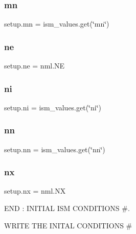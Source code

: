 \subsubsection{\texorpdfstring{mn}{mn}}
{\footnotesize\ttfamily setup.\+mn = ism\+\_\+values.\+get(\char`\"{}mn\char`\"{})}

\mbox{\label{namespacesetup_ac05943ff8cb3a75793d6458785d0a79f}} 
\subsubsection{\texorpdfstring{ne}{ne}}
{\footnotesize\ttfamily setup.\+ne = nml.\+NE}

\mbox{\label{namespacesetup_ad9ce8bcb8e2c0ccab520d9f110ea46a7}} 
\subsubsection{\texorpdfstring{ni}{ni}}
{\footnotesize\ttfamily setup.\+ni = ism\+\_\+values.\+get(\char`\"{}ni\char`\"{})}

\mbox{\label{namespacesetup_a26490aaba8991b0c3889206244da6ebf}} 
\subsubsection{\texorpdfstring{nn}{nn}}
{\footnotesize\ttfamily setup.\+nn = ism\+\_\+values.\+get(\char`\"{}nn\char`\"{})}

\mbox{\label{namespacesetup_acdd28dabaab21c1904ea9382e5f6a8db}} 
\subsubsection{\texorpdfstring{nx}{nx}}
{\footnotesize\ttfamily setup.\+nx = nml.\+NX}



E\+ND \+: I\+N\+I\+T\+I\+AL I\+SM C\+O\+N\+D\+I\+T\+I\+O\+NS \#. 

W\+R\+I\+TE T\+HE I\+N\+I\+T\+AL C\+O\+N\+D\+I\+T\+I\+O\+NS \# \mbox{\label{namespacesetup_a7951a015fdeba223e18f4bc68c9a6e5e}} 
